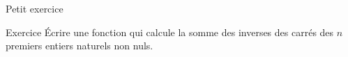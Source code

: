\documentclass[10pt,xcolor=dvipsnames]{beamer}
\begin{document}
\begin{frame}{Petit exercice}
    \begin{alertblock}{Exercice}
    Écrire une fonction qui calcule la somme des inverses des carrés des $n$ premiers entiers naturels non nuls.
    \end{alertblock}
\end{frame}
\end{document}

